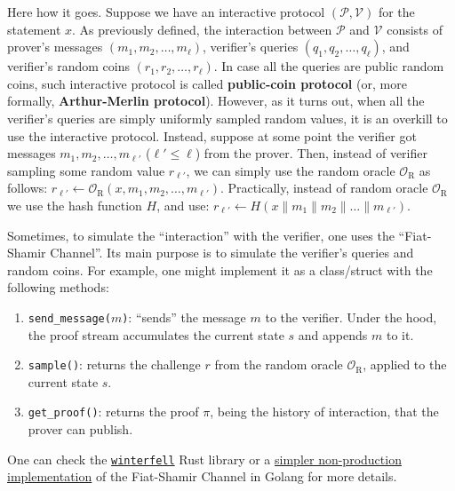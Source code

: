 \documentclass[../lecture-notes.tex]{subfiles}
\begin{document}
Here how it goes. Suppose we have an interactive protocol $(\mathcal{P}, \mathcal{V})$ for the statement $x$. As previously defined, the interaction between $\mathcal{P}$ and $\mathcal{V}$ consists of prover's messages $(m_1,m_2,\dots,m_{\ell})$, verifier's queries $(q_1,q_2,\dots,q_{\ell})$, and verifier's random coins $(r_1,r_2,\dots,r_{\ell})$. In case all the queries are public random coins, such interactive protocol is called \textbf{public-coin protocol} (or, more formally, \textbf{Arthur-Merlin protocol}). However, as it turns out, when all the verifier's queries are simply uniformly sampled random values, it is an overkill to use the interactive protocol. Instead, suppose at some point the verifier got messages $m_1,m_2,\dots,m_{\ell'}$ ($\ell' \leq \ell$) from the prover. Then, instead of verifier sampling some random value $r_{\ell'}$, we can simply use the random oracle $\mathcal{O}_{\text{R}}$ as follows: $r_{\ell'} \gets \mathcal{O}_{\text{R}}(x,m_1,m_2,\dots,m_{\ell'})$. Practically, instead of random oracle $\mathcal{O}_{\text{R}}$ we use the hash function $H$, and use: $r_{\ell'} \gets H(x \parallel m_1 \parallel m_2 \parallel \dots \parallel m_{\ell'})$.

\begin{remark}
    Sometimes, to simulate the ``interaction'' with the verifier, one uses the ``Fiat-Shamir Channel''. Its main purpose is to simulate the verifier's queries and random coins. For example, one might implement it as a class/struct with the following methods:
    \begin{enumerate}
        \item \texttt{send\_message($m$)}: ``sends'' the message $m$ to the verifier. Under the hood, the proof stream accumulates the current state $s$ and appends $m$ to it.
        \item \texttt{sample()}: returns the challenge $r$ from the random oracle $\mathcal{O}_{\text{R}}$, applied to the current state $s$.
        \item \texttt{get\_proof()}: returns the proof $\pi$, being the history of interaction, that the prover can publish.
    \end{enumerate}

    One can check the \href{https://github.com/facebook/winterfell/blob/main/prover/src/channel.rs}{\texttt{winterfell}} Rust library or a \href{https://github.com/actuallyachraf/zkstarks/blob/master/fs.go}{simpler non-production implementation} of the Fiat-Shamir Channel in Golang for more details.
\end{remark}
\end{document}
